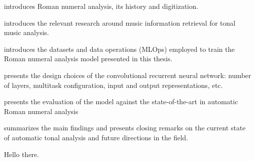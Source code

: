 introduces Roman numeral analysis, its history and
digitization.

 introduces the relevant research around
music information retrieval for tonal music analysis.

 introduces the
datasets and data operations (MLOps) employed to train the
Roman numeral analysis model presented in this thesis.

 presents the design choices of the
convolutional recurrent neural network: number of layers,
multitask configuration, input and output representations,
etc.

 presents the evaluation of
the model against the state-of-the-art in automatic Roman
numeral analysis

 summarizes the main findings and
presents closing remarks on the current state of automatic
tonal analysis and future directions in the field.

Hello there.
